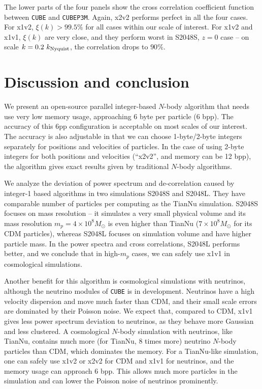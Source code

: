 \documentclass[10pt,twocolumn,preprint]{emulateapj}
\newcommand{\Msun}{M_\odot}
\begin{document}
The lower parts of the four panels show the cross correlation coefficient function between {\tt CUBE} and {\tt CUBEP3M}. Again, x2v2 performs perfect in all the four cases. For x1v2, $\xi(k)>99.5\%$ for all cases within our scale of interest. For x1v2 and x1v1, $\xi(k)$ are very close, and they perform worst in S2048S, $z=0$ case -- on scale $k=0.2\ k_{\rm Nyquist}$, the correlation drops to $90\%$.


\section{Discussion and conclusion}\label{s.discussion}
We present an open-source parallel integer-based $N$-body algorithm that needs use very low memory usage, approaching 6 byte per particle (6 bpp). The accuracy of this 6pp configuration is acceptable on most scales of our interest. The accuracy is also adjustable in that we can choose 1-byte/2-byte integers separately for positions and velocities of particles. In the case of using 2-byte integers for both positions and velocities (``x2v2'', and memory can be 12 bpp), the algorithm gives exact results given by traditional $N$-body algorithms.

We analyze the deviation of power spectrum and de-correlation caused by integer-1 based algorithms in two simulations S2048S and S2048L. They have comparable number of particles per computing as the TianNu simulation. S2048S focuses on mass resolution -- it simulates a very small physical volume and its mass resolution $m_p=4\times 10^8\Msun$ is even higher than TianNu ($7\times 10^8\Msun$ for its CDM particles), whereas S2048L focuses on simulation volume and have higher particle mass. In the power spectra and cross correlations, S2048L performs better, and we conclude that in high-$m_p$ cases, we can safely use x1v1 in cosmological simulations.

Another benefit for this algorithm is cosmological simulations with neutrinos, although the neutrino modules of {\tt CUBE} is in development. Neutrinos have a high velocity dispersion and move much faster than CDM, and their small scale errors are dominated by their Poisson noise. We expect that, compared to CDM, x1v1 gives less power spectrum deviation to neutrinos, as they behave more Gaussian and less clustered. A cosmological $N$-body simulation with neutrinos, like TianNu, contains much more (for TianNu, 8 times more) neutrino $N$-body particles than CDM, which dominates the memory. For a TianNu-like simulation, one can safely use x1v2 or x2v2 for CDM and x1v1 for neutrinos, and the memory usage can approach 6 bpp. This allows much more particles in the simulation and can lower the Poisson noise of neutrinos prominently.
\end{document}
